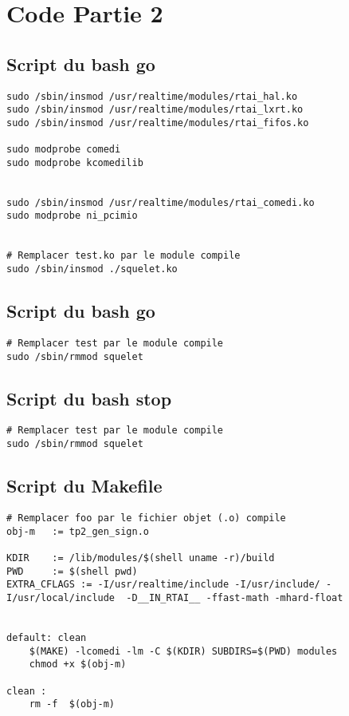 \section*{Code Partie 2}
\subsection*{Script du bash \textbf{go}}

%
\begin{lstlisting}[style = customMakefile]
sudo /sbin/insmod /usr/realtime/modules/rtai_hal.ko
sudo /sbin/insmod /usr/realtime/modules/rtai_lxrt.ko
sudo /sbin/insmod /usr/realtime/modules/rtai_fifos.ko

sudo modprobe comedi
sudo modprobe kcomedilib


sudo /sbin/insmod /usr/realtime/modules/rtai_comedi.ko
sudo modprobe ni_pcimio


# Remplacer test.ko par le module compile
sudo /sbin/insmod ./squelet.ko
\end{lstlisting}

\subsection*{Script du bash \textbf{go}}

%
\begin{lstlisting}[style = customMakefile]
# Remplacer test par le module compile
sudo /sbin/rmmod squelet
\end{lstlisting}
\subsection*{Script du bash \textbf{stop}}
\begin{lstlisting}[style = customMakefile]
# Remplacer test par le module compile
sudo /sbin/rmmod squelet
\end{lstlisting}
\subsection*{Script du \textbf{Makefile}}
\begin{lstlisting}[style = customMakefile]
# Remplacer foo par le fichier objet (.o) compile
obj-m	:= tp2_gen_sign.o

KDIR	:= /lib/modules/$(shell uname -r)/build
PWD		:= $(shell pwd)
EXTRA_CFLAGS := -I/usr/realtime/include -I/usr/include/ -I/usr/local/include  -D__IN_RTAI__ -ffast-math -mhard-float


default: clean
	$(MAKE) -lcomedi -lm -C $(KDIR) SUBDIRS=$(PWD) modules
	chmod +x $(obj-m)
	
clean :
	rm -f  $(obj-m)
\end{lstlisting}
\newpage
